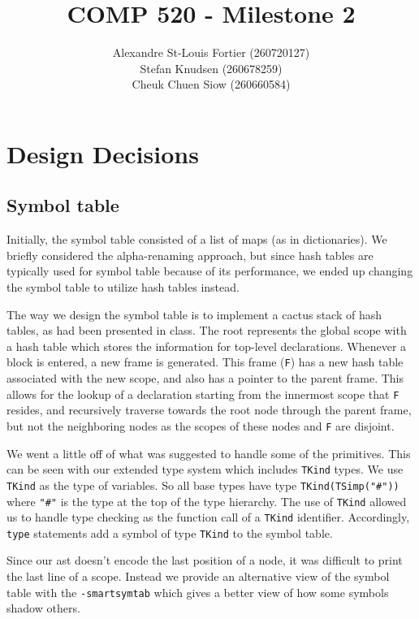 \documentclass{article}
\begin{document}
\title{COMP 520 - Milestone 2}
\author{
Alexandre St-Louis Fortier (260720127)\\
Stefan Knudsen (260678259)\\
Cheuk Chuen Siow (260660584)}
\maketitle

\raggedright
\section*{Design Decisions}
\subsection*{Symbol table}
Initially, the symbol table consisted of a list of maps (as in dictionaries). We briefly considered the alpha-renaming approach, but since hash tables are typically used for symbol table because of its performance, we ended up changing the symbol table to utilize hash tables instead.

The way we design the symbol table is to implement a cactus stack of hash tables, as had been presented in class. The root represents the global scope with a hash table which stores the information for top-level declarations. Whenever a block is entered, a new frame is generated. This frame (\verb|F|) has a new hash table associated with the new scope, and also has a pointer to the parent frame. This allows for the lookup of a declaration starting from the innermost scope that \verb|F| resides, and recursively traverse towards the root node through the parent frame, but not the neighboring nodes as the scopes of these nodes and \verb|F| are disjoint.

We went a little off of what was suggested to handle some of the primitives.
This can be seen with our extended type system which includes \verb|TKind| types.
We use \verb|TKind| as the type of variables. So all base types have type \verb|TKind(TSimp("#"))| where \verb|"#"| is the type at the top of the type hierarchy. The use of \verb|TKind| allowed us to handle type checking as the function call of a \verb|TKind| identifier.
Accordingly, \verb|type| statements add a symbol of type \verb|TKind| to the symbol
table.

Since our ast doesn't encode the last position of a node, it was difficult to
print the last line of a scope. Instead we provide an alternative view of the
symbol table with the \verb|-smartsymtab| which gives a better view of how
some symbols shadow others.
\end{document}
